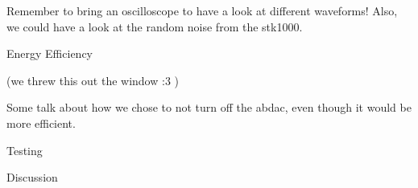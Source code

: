 

Remember to bring an oscilloscope to have a look at different waveforms! Also, we could have a look at the random noise from the stk1000.

Energy Efficiency

(we threw this out the window :3 )

Some talk about how we chose to not turn off the abdac, even though it would be more efficient.


Testing


Discussion
